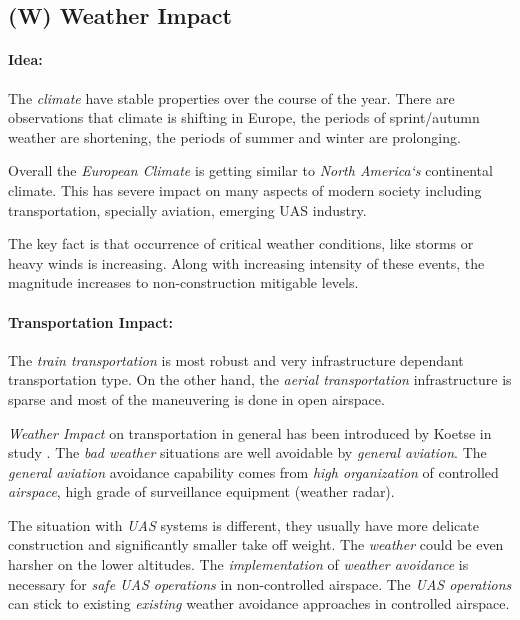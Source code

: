 \setcounter{chapter}{6}
\setcounter{section}{7}
\setcounter{subsection}{3}

\subsection{(W) Weather Impact}\label{sec:WeatherImpact}

\paragraph{Idea:} The \emph{climate} have stable properties over the course of the year. There are observations that climate is shifting in Europe, the periods of sprint/autumn weather are shortening, the periods of summer and winter are prolonging. 

Overall the \emph{European Climate} is getting similar to \emph{North America`s} continental climate. This has severe impact on many aspects of modern society including transportation, specially aviation, emerging UAS industry. 

The key fact is that occurrence of critical weather conditions, like storms or heavy winds is increasing. Along with increasing intensity of these events, the magnitude increases to non-construction mitigable levels.

\paragraph{Transportation Impact:} The \emph{train transportation} is most robust and very infrastructure dependant transportation type. On the other hand, the \emph{aerial transportation} infrastructure is sparse and most of the maneuvering is done in open airspace. 

\emph{Weather Impact} on transportation in general has been introduced by Koetse in study \cite{koetse2009impact}. The \emph{bad weather} situations are well avoidable by \emph{general aviation}. The \emph{general aviation} avoidance capability comes from \emph{high organization} of controlled \emph{airspace}, high grade of surveillance equipment (weather radar).

The situation with \emph{UAS} systems is different, they usually have more delicate construction and significantly smaller take off weight. The \emph{weather} could be even harsher on the lower altitudes. The \emph{implementation} of \emph{weather avoidance} is necessary for \emph{safe UAS operations} in non-controlled airspace. The \emph{UAS operations} can stick to existing \emph{existing} weather avoidance approaches in controlled airspace. 

